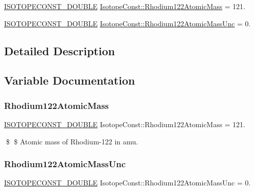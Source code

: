 \begin{DoxyCompactItemize}
\item 
\mbox{\hyperlink{group___isotope_const-_macros_ga8f45a7272ce02c0b4c65c44636ed719a}{I\+S\+O\+T\+O\+P\+E\+C\+O\+N\+S\+T\+\_\+\+D\+O\+U\+B\+LE}} \mbox{\hyperlink{group___isotope_const-_rhodium-_rh122_ga7ce2ef1d1b620be21e6e5980ac915ac3}{Isotope\+Const\+::\+Rhodium122\+Atomic\+Mass}} = 121.
\item 
\mbox{\hyperlink{group___isotope_const-_macros_ga8f45a7272ce02c0b4c65c44636ed719a}{I\+S\+O\+T\+O\+P\+E\+C\+O\+N\+S\+T\+\_\+\+D\+O\+U\+B\+LE}} \mbox{\hyperlink{group___isotope_const-_rhodium-_rh122_ga93d684e96228b371e4b8a061110bef22}{Isotope\+Const\+::\+Rhodium122\+Atomic\+Mass\+Unc}} = 0.
\end{DoxyCompactItemize}


\subsection{Detailed Description}


\subsection{Variable Documentation}
\mbox{\label{group___isotope_const-_rhodium-_rh122_ga7ce2ef1d1b620be21e6e5980ac915ac3}} 
\subsubsection{\texorpdfstring{Rhodium122\+Atomic\+Mass}{Rhodium122AtomicMass}}
{\footnotesize\ttfamily \mbox{\hyperlink{group___isotope_const-_macros_ga8f45a7272ce02c0b4c65c44636ed719a}{I\+S\+O\+T\+O\+P\+E\+C\+O\+N\+S\+T\+\_\+\+D\+O\+U\+B\+LE}} Isotope\+Const\+::\+Rhodium122\+Atomic\+Mass = 121.}

\$ \$ Atomic mass of Rhodium-\/122 in amu. \mbox{\label{group___isotope_const-_rhodium-_rh122_ga93d684e96228b371e4b8a061110bef22}} 
\subsubsection{\texorpdfstring{Rhodium122\+Atomic\+Mass\+Unc}{Rhodium122AtomicMassUnc}}
{\footnotesize\ttfamily \mbox{\hyperlink{group___isotope_const-_macros_ga8f45a7272ce02c0b4c65c44636ed719a}{I\+S\+O\+T\+O\+P\+E\+C\+O\+N\+S\+T\+\_\+\+D\+O\+U\+B\+LE}} Isotope\+Const\+::\+Rhodium122\+Atomic\+Mass\+Unc = 0.}

